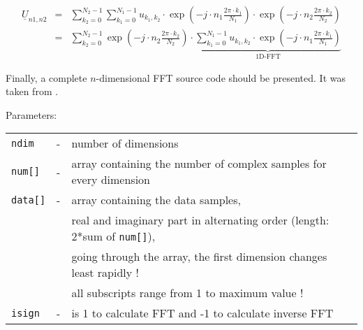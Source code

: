 \begin{eqnarray}
\underline{U}_{n1,n2} & = & \sum_{k_2=0}^{N_2-1} \sum_{k_1=0}^{N_1-1}
   u_{k_1,k_2}\cdot \exp\left( -j\cdot n_1\frac{2\pi\cdot k_1}{N_1} \right)
              \cdot \exp\left( -j\cdot n_2\frac{2\pi\cdot k_2}{N_2} \right) \\
 & = & \sum_{k_2=0}^{N_2-1} \exp\left( -j\cdot n_2\frac{2\pi\cdot k_2}{N_2} \right)
       \cdot \underbrace{ \sum_{k_1=0}^{N_1-1}
   u_{k_1,k_2}\cdot \exp\left( -j\cdot n_1\frac{2\pi\cdot k_1}{N_1} \right) }_\text{1D-FFT}
\end{eqnarray}


Finally, a complete $n$-dimensional FFT source code should be
presented. It was taken from \cite{Press}.

\addvspace{12pt}

Parameters:\\
\begin{tabular}{lcl}
\texttt{ndim}   & - & number of dimensions\\
\texttt{num[]}  & - & array containing the number of complex samples for every dimension\\
\texttt{data[]} & - & array containing the data samples,\\
                &   & real and imaginary part in alternating order (length: 2*sum of \texttt{num[]}),\\
                &   & going through the array, the first dimension changes least rapidly !\\
                &   & all subscripts range from 1 to maximum value !\\
\texttt{isign}  & - & is 1 to calculate FFT and -1 to calculate inverse FFT
\end{tabular}

\addvspace{12pt}


